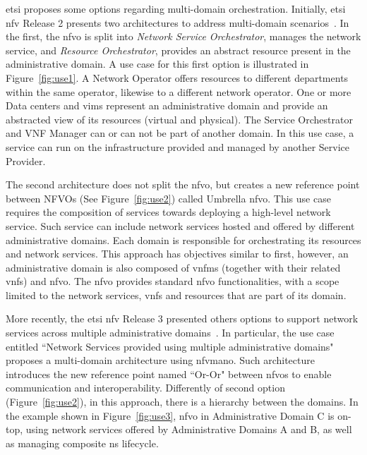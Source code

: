 \gls{etsi} proposes some options regarding multi-domain orchestration. Initially, \gls{etsi} \gls{nfv}  Release 2 presents two architectures to address multi-domain scenarios~\cite{ETSIIndustrySpecificationGroupISGNFV2014NetworkOptions}. In the first, the \gls{nfvo} is split into \textit{Network Service Orchestrator}, manages the network service, and \textit{Resource Orchestrator}, provides an abstract resource present in the administrative domain. A use case for this first option is illustrated in Figure~\ref{fig:use1}. A Network Operator offers resources to different departments within the same operator, likewise to a different network operator. One or more Data centers and \glspl{vim} represent an administrative domain and provide an abstracted view of its resources (virtual and physical). The Service Orchestrator and VNF Manager can or can not be part of another domain. In this use case, a service can run on the infrastructure provided and managed by another Service Provider.

The second architecture does not split the \gls{nfvo}, but creates a new reference point between NFVOs (See Figure~\ref{fig:use2}) called  Umbrella \gls{nfvo}. This use case requires the composition of services towards deploying a high-level network service. Such service can include network services hosted and offered by different administrative domains. Each domain is responsible for orchestrating its resources and network services. This approach has objectives similar to first, however, an administrative domain is also composed of \glspl{vnfm} (together with their related \glspl{vnf}) and \gls{nfvo}. The \gls{nfvo} provides standard \gls{nfvo} functionalities, with a scope limited to the network services, \glspl{vnf} and resources that are part of its domain.

More recently, the \gls{etsi} \gls{nfv} Release 3 presented others options to support network services across multiple administrative domains~\cite{ETSIGRDomains}. In particular, the use case entitled ``Network Services provided using multiple administrative domains" proposes a multi-domain architecture using \gls{nfvmano}. Such architecture introduces the new reference point named ``Or-Or" between \glspl{nfvo} to enable communication and interoperability. Differently of second option (Figure~\ref{fig:use2}), in this approach, there is a hierarchy between the domains. In the example shown in Figure~\ref{fig:use3}, \gls{nfvo} in Administrative Domain C is on-top, using network services offered by Administrative Domains A and B, as well as managing composite \gls{ns} lifecycle.    

